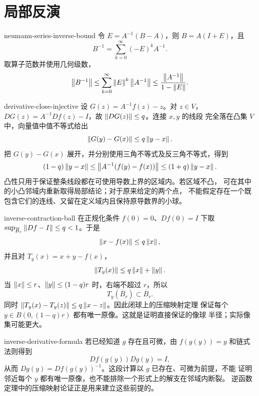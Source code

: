\chapter{局部反演}
\label{chap:local-inversion-solutions}

\begin{solution}{neumann-series-inverse-bound}
令 $E=A^{-1}(B-A)$，则 $B=A(I+E)$，且
\[
 B^{-1}=\sum_{k=0}^{\infty}(-E)^kA^{-1}.
\]
取算子范数并使用几何级数，
\[
 \left\lVert B^{-1}\right\rVert
 \le\sum_{k=0}^{\infty}\left\lVert E\right\rVert^k\left\lVert A^{-1}\right\rVert
 \le\frac{\left\lVert A^{-1}\right\rVert}{1-\left\lVert E\right\rVert}.
\]
\end{solution}

\begin{solution}{derivative-close-injective}
设 $G(z)=A^{-1}f(z)-z$。对 $z\in V$，
$DG(z)=A^{-1}Df(z)-I$，故 $\left\lVert DG(z)\right\rVert\le q$。连接 $x,y$ 的线段
完全落在凸集 $V$ 中，向量值中值不等式给出
\[
 \left\lVert G(y)-G(x)\right\rVert\le q\left\lVert y-x\right\rVert.
\]
把 $G(y)-G(x)$ 展开，并分别使用三角不等式及反三角不等式，得到
\[
 (1-q)\left\lVert y-x\right\rVert
 \le\left\lVert A^{-1}(f(y)-f(x))\right\rVert
 \le(1+q)\left\lVert y-x\right\rVert.
\]
凸性只用于保证整条线段都在可使用导数上界的区域内。若区域不凸，
可在其中的小凸邻域内重新取得局部结论；对于原来给定的两个点，
不能假定存在一个既包含它们的连线、又留在定义域内且保持原导数界的小球。
\end{solution}

\begin{solution}{inverse-contraction-ball}
在正规化条件 $f(0)=0$、$Df(0)=I$ 下取
$\sup_{\overline B_r}\left\lVert Df-I\right\rVert\le q<1$。于是
\[
 \left\lVert x-f(x)\right\rVert\le q\left\lVert x\right\rVert,
\]
并且对 $T_y(x)=x+y-f(x)$，
\[
 \left\lVert T_y(x)\right\rVert\le q\left\lVert x\right\rVert+\left\lVert y\right\rVert.
\]
当 $\left\lVert x\right\rVert\le r$、$\left\lVert y\right\rVert\le(1-q)r$ 时，右端不超过 $r$，所以
\[
 T_y(\overline B_r)\subset\overline B_r.
\]
同时 $\left\lVert T_y(x)-T_y(z)\right\rVert\le q\left\lVert x-z\right\rVert$。因此闭球上的压缩映射定理
保证每个 $y\in B(0,(1-q)r)$ 都有唯一原像。这就是证明直接保证的像球
半径；实际像集可能更大。
\end{solution}

\begin{solution}{inverse-derivative-formula}
若已经知道 $g$ 存在且可微，由 $f(g(y))=y$ 和链式法则得到
\[
 Df(g(y))Dg(y)=I,
\]
从而 $Dg(y)=Df(g(y))^{-1}$。这段计算以 $g$ 已存在、可微为前提，不能
证明邻近每个 $y$ 都有唯一原像，也不能排除一个形式上的解支在邻域内断裂。
逆函数定理中的压缩映射论证正是用来建立这些前提的。
\end{solution}


